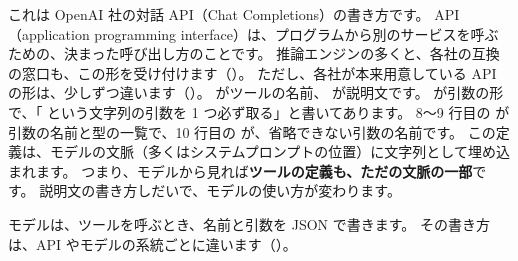 
これは OpenAI 社の対話 API（Chat Completions）の書き方です。
API（application programming interface）は、プログラムから別のサービスを呼ぶための、決まった呼び出し方のことです。
推論エンジンの多くと、各社の互換の窓口も、この形を受け付けます（）。
ただし、各社が本来用意している API の形は、少しずつ違います（）。
 がツールの名前、 が説明文です。
 が引数の形で、「 という文字列の引数を 1 つ必ず取る」と書いてあります。
8〜9 行目の  が引数の名前と型の一覧で、10 行目の  が、省略できない引数の名前です。
この定義は、モデルの文脈（多くはシステムプロンプトの位置）に文字列として埋め込まれます。
つまり、モデルから見れば\textbf{ツールの定義も、ただの文脈の一部}です。
説明文の書き方しだいで、モデルの使い方が変わります。

モデルは、ツールを呼ぶとき、名前と引数を JSON で書きます。
その書き方は、API やモデルの系統ごとに違います（）。

